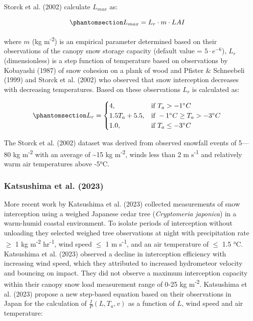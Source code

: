 \documentclass[
  letterpaper,
]{tex/uofsthesis-cs}
\begin{document}
Storck et al. (2002) calculate \(L_{max}\) as:

\begin{equation}\phantomsection\label{eq-imax-storck-andreas}{
L_{max} = L_r \cdot m \cdot LAI
}\end{equation}

where \(m\) (kg m\textsuperscript{-2}) is an empirical parameter
determined based on their observations of the canopy snow storage
capacity (default value = \(5 \cdot e^{-6}\)), \(L_r\) (dimensionless)
is a step function of temperature based on observations by Kobayashi
(1987) of snow cohesion on a plank of wood and Pfister \& Schneebeli
(1999) and Storck et al. (2002) who observed that snow interception
decreases with decreasing temperatures. Based on these observations
\(L_r\) is calculated as:

\begin{equation}\phantomsection\label{eq-storck-andreas-lr}{
L_r = \begin{cases}
    4,& \text{if } T_a>-1 ^{\circ} C \\
    1.5 T_a+5.5,              & \text{if } -1 ^{\circ} C \geq T_a >-3 ^{\circ} C \\
        1.0,              & \text{if } T_a \leq -3 ^{\circ} C
\end{cases}
}\end{equation}

The Storck et al. (2002) dataset was derived from observed snowfall
events of 5---80 kg m\textsuperscript{-2} with an average of
\textasciitilde15 kg m\textsuperscript{-2}, winds less than 2 m
s\textsuperscript{-1} and relatively warm air temperatures above -5°C.

\subsubsection{Katsushima et al. (2023)}\label{katsushima2023}

More recent work by Katsushima et al. (2023) collected measurements of
snow interception using a weighed Japanese cedar tree (\emph{Cryptomeria
japonica}) in a warm-humid coastal environment. To isolate periods of
interception without unloading they selected weighed tree observations
at night with precipitation rate \(\ge\) 1 kg m\textsuperscript{-2}
hr\textsuperscript{-1}, wind speed \(\le\) 1 m s\textsuperscript{-1},
and an air temperature of \(\le\) 1.5 °C. Katsushima et al. (2023)
observed a decline in interception efficiency with increasing wind
speed, which they attributed to increased hydrometeor velocity and
bouncing on impact. They did not observe a maximum interception capacity
within their canopy snow load measurement range of 0-25 kg
m\textsuperscript{-2}. Katsushima et al. (2023) propose a new step-based
equation based on their observations in Japan for the calculation of
\(\frac{I}{P}(L, T_a, v)\) as a function of \(L\), wind speed and air
temperature:
\end{document}
